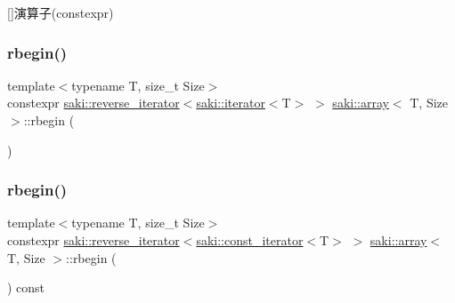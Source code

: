 \mbox{[}\mbox{]}演算子(constexpr) 

\mbox{\label{classsaki_1_1array_a965b61c1a08d2b4ef6157dbbe0f6896f}} 
\subsubsection{\texorpdfstring{rbegin()}{rbegin()}\hspace{0.1cm}{\footnotesize\ttfamily [1/2]}}
{\footnotesize\ttfamily template$<$typename T, size\+\_\+t Size$>$ \\
constexpr \mbox{\hyperlink{classsaki_1_1reverse__iterator}{saki\+::reverse\+\_\+iterator}}$<$\mbox{\hyperlink{classsaki_1_1iterator}{saki\+::iterator}}$<$T$>$ $>$ \mbox{\hyperlink{classsaki_1_1array}{saki\+::array}}$<$ T, Size $>$\+::rbegin (\begin{DoxyParamCaption}{ }\end{DoxyParamCaption})\hspace{0.3cm}{\ttfamily [inline]}}

\mbox{\label{classsaki_1_1array_addf57b18179a7556cf6fb177871873df}} 
\subsubsection{\texorpdfstring{rbegin()}{rbegin()}\hspace{0.1cm}{\footnotesize\ttfamily [2/2]}}
{\footnotesize\ttfamily template$<$typename T, size\+\_\+t Size$>$ \\
constexpr \mbox{\hyperlink{classsaki_1_1reverse__iterator}{saki\+::reverse\+\_\+iterator}}$<$\mbox{\hyperlink{classsaki_1_1const__iterator}{saki\+::const\+\_\+iterator}}$<$T$>$ $>$ \mbox{\hyperlink{classsaki_1_1array}{saki\+::array}}$<$ T, Size $>$\+::rbegin (\begin{DoxyParamCaption}{ }\end{DoxyParamCaption}) const\hspace{0.3cm}{\ttfamily [inline]}}

\mbox{\label{classsaki_1_1array_a5d90bcfe2a449d94d9aa7e7b6e77858f}} 
